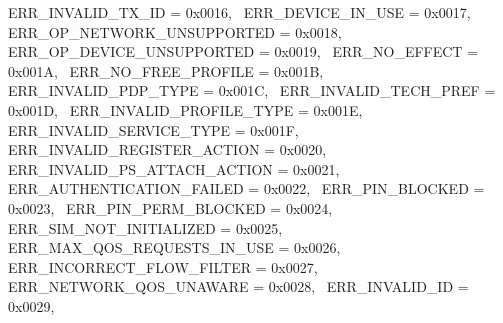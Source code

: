 \begin{DoxyItemize}
 E\+R\+R\+\_\+\+I\+N\+V\+A\+L\+I\+D\+\_\+\+T\+X\+\_\+\+ID = 0x0016,~\newline
 E\+R\+R\+\_\+\+D\+E\+V\+I\+C\+E\+\_\+\+I\+N\+\_\+\+U\+SE = 0x0017,~\newline
 E\+R\+R\+\_\+\+O\+P\+\_\+\+N\+E\+T\+W\+O\+R\+K\+\_\+\+U\+N\+S\+U\+P\+P\+O\+R\+T\+ED = 0x0018,~\newline
 E\+R\+R\+\_\+\+O\+P\+\_\+\+D\+E\+V\+I\+C\+E\+\_\+\+U\+N\+S\+U\+P\+P\+O\+R\+T\+ED = 0x0019,~\newline
 E\+R\+R\+\_\+\+N\+O\+\_\+\+E\+F\+F\+E\+CT = 0x001A,~\newline
 E\+R\+R\+\_\+\+N\+O\+\_\+\+F\+R\+E\+E\+\_\+\+P\+R\+O\+F\+I\+LE = 0x001B,~\newline
 E\+R\+R\+\_\+\+I\+N\+V\+A\+L\+I\+D\+\_\+\+P\+D\+P\+\_\+\+T\+Y\+PE = 0x001C,~\newline
 E\+R\+R\+\_\+\+I\+N\+V\+A\+L\+I\+D\+\_\+\+T\+E\+C\+H\+\_\+\+P\+R\+EF = 0x001D,~\newline
 E\+R\+R\+\_\+\+I\+N\+V\+A\+L\+I\+D\+\_\+\+P\+R\+O\+F\+I\+L\+E\+\_\+\+T\+Y\+PE = 0x001E,~\newline
 E\+R\+R\+\_\+\+I\+N\+V\+A\+L\+I\+D\+\_\+\+S\+E\+R\+V\+I\+C\+E\+\_\+\+T\+Y\+PE = 0x001F,~\newline
 E\+R\+R\+\_\+\+I\+N\+V\+A\+L\+I\+D\+\_\+\+R\+E\+G\+I\+S\+T\+E\+R\+\_\+\+A\+C\+T\+I\+ON = 0x0020,~\newline
 E\+R\+R\+\_\+\+I\+N\+V\+A\+L\+I\+D\+\_\+\+P\+S\+\_\+\+A\+T\+T\+A\+C\+H\+\_\+\+A\+C\+T\+I\+ON = 0x0021,~\newline
 E\+R\+R\+\_\+\+A\+U\+T\+H\+E\+N\+T\+I\+C\+A\+T\+I\+O\+N\+\_\+\+F\+A\+I\+L\+ED = 0x0022,~\newline
 E\+R\+R\+\_\+\+P\+I\+N\+\_\+\+B\+L\+O\+C\+K\+ED = 0x0023,~\newline
 E\+R\+R\+\_\+\+P\+I\+N\+\_\+\+P\+E\+R\+M\+\_\+\+B\+L\+O\+C\+K\+ED = 0x0024,~\newline
 E\+R\+R\+\_\+\+S\+I\+M\+\_\+\+N\+O\+T\+\_\+\+I\+N\+I\+T\+I\+A\+L\+I\+Z\+ED = 0x0025,~\newline
 E\+R\+R\+\_\+\+M\+A\+X\+\_\+\+Q\+O\+S\+\_\+\+R\+E\+Q\+U\+E\+S\+T\+S\+\_\+\+I\+N\+\_\+\+U\+SE = 0x0026,~\newline
 E\+R\+R\+\_\+\+I\+N\+C\+O\+R\+R\+E\+C\+T\+\_\+\+F\+L\+O\+W\+\_\+\+F\+I\+L\+T\+ER = 0x0027,~\newline
 E\+R\+R\+\_\+\+N\+E\+T\+W\+O\+R\+K\+\_\+\+Q\+O\+S\+\_\+\+U\+N\+A\+W\+A\+RE = 0x0028,~\newline
 E\+R\+R\+\_\+\+I\+N\+V\+A\+L\+I\+D\+\_\+\+ID = 0x0029,~\newline

\end{DoxyItemize}
